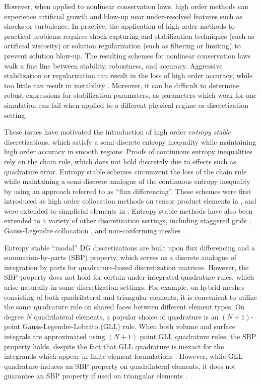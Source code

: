 \documentclass{svjour3}                     %
\begin{document}
However, when applied to nonlinear conservation laws, high order methods can experience artificial growth and blow-up near under-resolved features such as shocks or turbulence.  In practice, the application of high order methods to practical problems requires shock capturing and stabilization techniques (such as artificial viscosity) or solution regularization (such as filtering or limiting) to prevent solution blow-up.  The resulting schemes for nonlinear conservation laws walk a fine line between stability, robustness, and accuracy.  Aggressive stabilization or regularization can result in the loss of high order accuracy, while too little can result in instability \cite{wang2013high}.  Moreover, it can be difficult to determine robust expressions for stabilization paramaters, as parameters which work for one simulation can fail when applied to a different physical regime or discretization setting.  

These issues have motivated the introduction of high order \textit{entropy stable} discretizations, which satisfy a semi-discrete entropy inequality while maintaining high order accuracy in smooth regions.  Proofs of continuous entropy inequalities rely on the chain rule, which does not hold discretely due to effects such as quadrature error.   Entropy stable schemes circumvent the loss of the chain rule while maintaining a semi-discrete analogue of the continuous entropy inequality by using an approach referred to as ``flux differencing''.  These schemes were first introduced as high order collocation methods on tensor product elements in \cite{fisher2013high, carpenter2014entropy, gassner2016split, gassner2017br1}, and were extended to simplicial elements in \cite{crean2017high, chen2017entropy, crean2018entropy, chan2017discretely, chan2018discretely}.  Entropy stable methods have also been extended to a variety of other discretization settings, including staggered grids \cite{parsani2016entropy}, Gauss-Legendre collocation \cite{chan2018efficient}, and non-conforming meshes \cite{friedrich2017entropy}.  

Entropy stable ``modal'' DG discretizations \cite{chan2017discretely, chan2018discretely} are built upon flux differencing and a summation-by-parts (SBP) property, which serves as a discrete analogue of integration by parts for quadrature-based discretization matrices.  However, the SBP property does not hold for certain under-integrated quadrature rules, which arise naturally in some discretization settings.  For example, on hybrid meshes consisting of both quadrilateral and triangular elements, it is convenient to utilize the same quadrature rule on shared faces between different element types.  On degree $N$ quadrilateral elements, a popular choice of quadrature is an $(N+1)$-point Gauss-Legendre-Lobatto (GLL) rule.  When both volume and surface integrals are approximated using $(N+1)$ point GLL quadrature rules, the SBP property holds, despite the fact that GLL quadrature is inexact for the integrands which appear in finite element formulations \cite{fisher2013high}.  However, while GLL quadrature induces an SBP property on quadrilateral elements, it does not guarantee an SBP property if used on triangular elements \cite{chan2017discretely}.  
\end{document}
